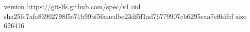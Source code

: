 version https://git-lfs.github.com/spec/v1
oid sha256:7afa83902798f5e71b99bf56aacdbe23df5f1ad76779907cb6295eaa7cf6dfcf
size 626416
